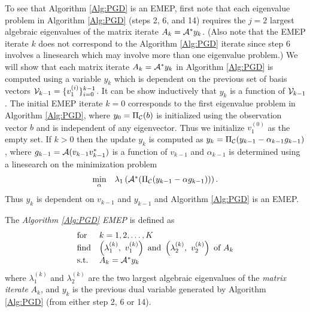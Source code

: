 \begin{enumerate}
To see that Algorithm \ref{Alg:PGD} is an EMEP, first note that each eigenvalue problem in Algorithm \ref{Alg:PGD} (steps 2, 6, and 14) requires the $j=2$ largest algebraic eigenvalues of the matrix iterate $A_k = {\mathcal A}^*y_k$.  (Also note that the EMEP iterate $k$ does not correspond to the Algorithm \ref{Alg:PGD} iterate since step 6 involves a linesearch which may involve more than one eigenvalue problem.)  We will show that each matrix iterate $A_k = {\mathcal A}^*y_k$ in Algorithm \ref{Alg:PGD} is computed using a variable $y_k$ which is dependent on the previous set of basis vectors ${\mathcal V}_{k-1} = \{ v_1^{(i)} \}_{i=0}^{k-1}$.  It can be show inductively that $y_k$ is a function of ${\mathcal V}_{k-1}$.  The initial EMEP iterate $k = 0$ corresponds to the first eigenvalue problem in Algorithm \ref{Alg:PGD}, where $y_0 = \Pi_{\mathcal C}(b)$ is initialized using the observation vector $b$ and is independent of any eigenvector.  Thus we initialize $v_1^{(0)}$ as the empty set.  If $k >0$ then the update $y_k$ is computed as $y_k = \Pi_{{\mathcal C}}(y_{k-1}- \alpha_{k-1}  g_{k-1})$, where $g_{k-1} = {\mathcal A}(v_{k-1} v_{k-1}^*)$ is a function of $v_{k-1}$ and $\alpha_{k-1}$ is determined using a linesearch on the minimization problem
\begin{equation}
\begin{array}{ll}
\min\limits_{\substack{\alpha}}
	&	\lambda_1 \left( {\mathcal A}^* ( \Pi_{\mathcal C} ( y_{k-1} - \alpha g_{k-1} ) )  \right).
\end{array}
\end{equation}
Thus $y_k$ is dependent on $v_{k-1}$ and $y_{k-1}$ and Algorithm \ref{Alg:PGD} is an EMEP.



The \textit{Algorithm \ref{Alg:PGD} EMEP} is defined as 
\begin{equation}		\label{Eqn:EMEP_PLGD}
\begin{array}{ll}
\textnormal{for}
	&	k = 1, 2, \ldots, K		\\
\textnormal{find}	
	&	\left( \lambda^{(k)}_1, \ v^{(k)}_1 \right) \textnormal{ and } \left( \lambda^{(k)}_2, \ v^{(k)}_2 \right) \textnormal{ of } A_k
		\\
\textnormal{s.t.}
	&	A_{k} = {\mathcal A}^*y_k
\end{array}
\end{equation}
where $\lambda^{(k)}_1$ and $\lambda^{(k)}_2$ are the two largest algebraic eigenvalues of the \textit{matrix iterate} $A_k$, and $y_k$ is the previous dual variable generated by Algorithm \ref{Alg:PGD} (from either step 2, 6 or 14).









\end{enumerate}
